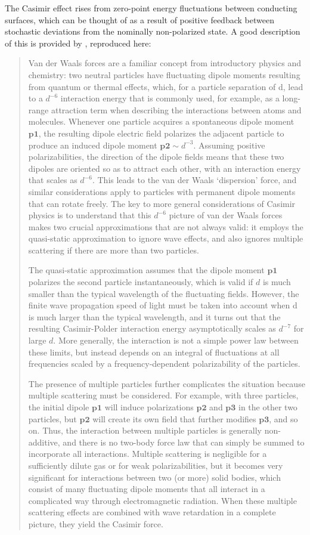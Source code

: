 \documentclass[11pt,traditabstract]{article}
\begin{document}
The Casimir effect rises from zero-point energy fluctuations between conducting surfaces, which can be thought of as a result of positive feedback between stochastic deviations from the nominally non-polarized state. A good description of this is provided by \citet{rodr}, reproduced here:
\begin{quote}
Van der Waals forces are a familiar concept from introductory physics and chemistry: two neutral particles have fluctuating dipole moments resulting from quantum or thermal effects, which, for a particle separation of d, lead to a $d^{-6}$ interaction energy that is commonly used, for example, as a long-range attraction term when describing the interactions between atoms and molecules. Whenever one particle acquires a spontaneous dipole moment $\mathbf{p1}$, the resulting dipole electric field polarizes the adjacent particle to produce an induced dipole moment $\mathbf{p2}\sim d^{-3}$. Assuming positive polarizabilities, the direction of the dipole fields means that these two dipoles are oriented so as to attract each other, with an interaction energy that scales as $d^{-6}$. This leads to the van der Waals `dispersion' force, and similar considerations apply to particles with permanent dipole moments that can rotate freely. The key to more general considerations of Casimir physics is to understand that this $d^{-6}$ picture of van der Waals forces makes two crucial approximations that are not always valid: it employs the quasi-static approximation to ignore wave effects, and also ignores multiple scattering if there are more than two particles.

The quasi-static approximation assumes that the dipole moment $\mathbf{p1}$ polarizes the second particle instantaneously, which is valid if $d$ is much smaller than the typical wavelength of the fluctuating fields. However, the finite wave propagation speed of light must be taken into account when d is much larger than the typical wavelength, and it turns out that the resulting Casimir-Polder interaction energy asymptotically scales as $d^{-7}$ for large $d$. More generally, the interaction is not a simple power law between these limits, but instead depends on an integral of fluctuations at all frequencies scaled by a frequency-dependent polarizability of the particles.

The presence of multiple particles further complicates the situation because multiple scattering must be considered. For example, with three particles, the initial dipole $\mathbf{p1}$ will induce polarizations $\mathbf{p2}$ and $\mathbf{p3}$ in the other two particles, but $\mathbf{p2}$ will create its own field that further modifies $\mathbf{p3}$, and so on. Thus, the interaction between multiple particles is generally non-additive, and there is no two-body force law that can simply be summed to incorporate all interactions. Multiple scattering is negligible for a sufficiently dilute gas or for weak polarizabilities, but it becomes very significant for interactions between two (or more) solid bodies, which consist of many fluctuating dipole moments that all interact in a complicated way through electromagnetic radiation. When these multiple scattering effects are combined with wave retardation in a complete picture, they yield the Casimir force.


\end{quote}
\end{document}
